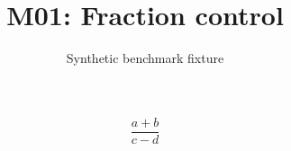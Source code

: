 \documentclass{article}
\title{M01: Fraction control}
\author{Synthetic benchmark fixture}
\date{}
\begin{document}
\maketitle
\[\frac{a+b}{c-d}\]
\end{document}
